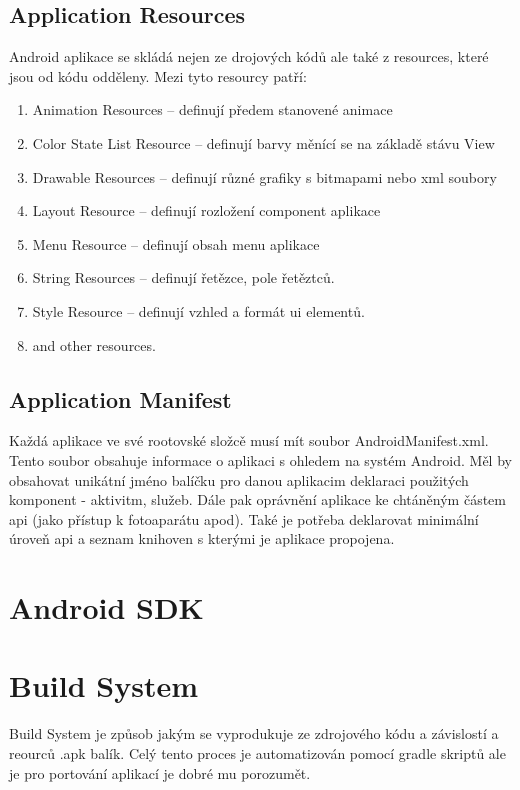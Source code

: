 \subsection{Application Resources} %
Android aplikace se skládá nejen ze drojových kódů ale také z resources, které jsou od kódu odděleny. Mezi tyto resourcy patří:
\begin{enumerate}
\item Animation Resources -- definují předem stanovené animace
\item Color State List Resource -- definují barvy měnící se na základě stávu View
\item Drawable Resources -- definují různé grafiky s bitmapami nebo xml soubory
\item Layout Resource -- definují rozložení component aplikace
\item Menu Resource -- definují obsah menu aplikace
\item String Resources -- definují řetězce, pole řetěztců.
\item Style Resource -- definují vzhled a formát ui elementů.
\item and other resources.
\end{enumerate}

\subsection{Application Manifest} %
Každá aplikace ve své rootovské složcě musí mít soubor AndroidManifest.xml. Tento soubor obsahuje informace o aplikaci s ohledem na systém Android. Měl by obsahovat unikátní jméno balíčku pro danou aplikacim deklaraci použitých komponent - aktivitm, služeb. Dále pak oprávnění aplikace ke chtáněným částem api (jako přístup k fotoaparátu apod). Také je potřeba deklarovat minimální úroveň api a seznam knihoven s kterými je aplikace propojena.

\section{Android SDK}

\section{Build System}%
Build System je způsob jakým se vyprodukuje ze zdrojového kódu a závislostí a reourců .apk balík. Celý tento proces je automatizován pomocí gradle skriptů ale je pro portování aplikací je dobré mu porozumět.

